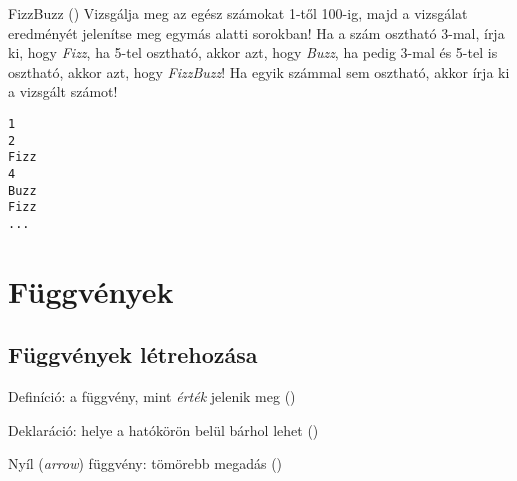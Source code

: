 \documentclass[usenames,dvipsnames,aspectratio=169]{beamer}
\begin{document}
\begin{frame}[fragile]
    \begin{exampleblock}{FizzBuzz ()}
        Vizsgálja meg az egész számokat 1-től 100-ig, majd a vizsgálat eredményét jelenítse meg egymás alatti sorokban! Ha a szám osztható 3-mal, írja ki, hogy \emph{Fizz}, ha 5-tel osztható, akkor azt, hogy \emph{Buzz}, ha pedig 3-mal és 5-tel is osztható, akkor azt, hogy \emph{FizzBuzz}! Ha egyik számmal sem osztható, akkor írja ki a vizsgált számot!\\
        \begin{verbatim}
1
2
Fizz
4
Buzz
Fizz
...
\end{verbatim}
    \end{exampleblock}
\end{frame}

\section{Függvények}

\subsection{Függvények létrehozása}

\begin{frame}
    \begin{exampleblock}{Definíció: a függvény, mint \emph{érték} jelenik meg ()}
        \small
        
    \end{exampleblock}
\end{frame}

\begin{frame}
    \begin{exampleblock}{Deklaráció: helye a hatókörön belül bárhol lehet ()}
        \small
        
    \end{exampleblock}
\end{frame}

\begin{frame}
    \begin{exampleblock}{Nyíl (\emph{arrow}) függvény: tömörebb megadás ()}
        \small
        
    \end{exampleblock}
\end{frame}
\end{document}
